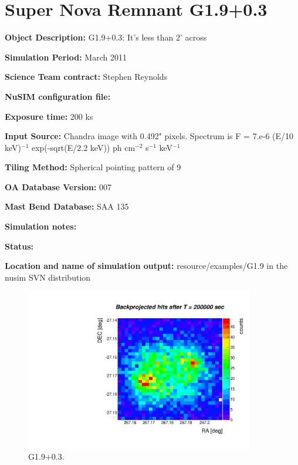 
\newpage

\section{Super Nova Remnant G1.9+0.3}

\textbf{Object Description:} G1.9+0.3: It's less than 2' across

\textbf{Simulation Period:} March 2011

\textbf{Science Team contract:} Stephen Reynolds

\textbf{NuSIM configuration file:}

\textbf{Exposure time:} 200 ks

\textbf{Input Source:} Chandra image with 0.492" pixels.  Spectrum is F = 7.e-6 (E/10 keV)$^{-1}$ exp(-sqrt(E/2.2 keV)) ph cm$^{-2}$ s$^{-1}$ keV$^{-1}$ 

\textbf{Tiling Method:} Spherical pointing pattern of 9 

\textbf{OA Database Version:} 007

\textbf{Mast Bend Database:} SAA 135

\textbf{Simulation notes:} 

\textbf{Status:} 

\textbf{Location and name of simulation output:} resource/examples/G1.9 in the nusim SVN distribution

\begin{figure}[h]
\begin{center}
\includegraphics[width=10cm]{G1.9/G19.pdf}  %
\caption{G1.9+0.3.}
\label{g19} 
\end{center}
\end{figure}

